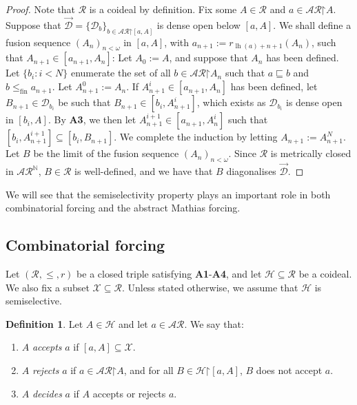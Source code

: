 \documentclass[10pt,a4paper]{amsart}
\theoremstyle{plain}
\numberwithin{equation}{section}
\theoremstyle{definition}
\newtheorem{definition}[theorem]{Definition}
\newcommand{\func}{\operatorname}
\newcommand{\N}{\mathbb{N}}
\newcommand{\cal}{\mathcal}
\newcommand{\restrictedto}{\mathord{\upharpoonright}}
\newcommand{\X}{\cal{X}}
\renewcommand{\H}{\cal{H}}
\newcommand{\lh}{\func{lh}}
\newcommand{\fin}{\mathrm{fin}}
\newcommand{\D}{\cal{D}}
\begin{document}
\begin{proof}
    Note that $\cal{R}$ is a coideal by definition. Fix some $A \in \cal{R}$ and $a \in \cal{AR}\restrictedto A$. Suppose that $\vec{\D} = \{\D_b\}_{b \in \cal{AR}\restrictedto[a,A]}$ is dense open below $[a,A]$. We shall define a fusion sequence $(A_n)_{n<\omega}$ in $[a,A]$, with $a_{n+1} := r_{\lh(a)+n+1}(A_n)$, such that $A_{n+1} \in [a_{n+1},A_n]$: Let $A_0 := A$, and suppose that $A_n$ has been defined. Let $\{b_i : i < N\}$ enumerate the set of all $b \in \cal{AR}\restrictedto A_n$ such that $a \sqsubseteq b$ and $b \leq_\fin a_{n+1}$. Let $A_{n+1}^0 := A_n$. If $A_{n+1}^i \in [a_{n+1},A_n]$ has been defined, let $B_{n+1} \in \D_{b_i}$ be such that $B_{n+1} \in [b_i,A_{n+1}^i]$, which exists as $\D_{b_i}$ is dense open in $[b_i,A]$. By \textbf{A3}, we then let $A_{n+1}^{i+1} \in [a_{n+1},A_n^i]$ such that $[b_i,A_{n+1}^{i+1}] \subseteq [b_i,B_{n+1}]$. We complete the induction by letting $A_{n+1} := A_{n+1}^N$. Let $B$ be the limit of the fusion sequence $(A_n)_{n<\omega}$. Since $\cal{R}$ is metrically closed in $\cal{AR}^\N$, $B \in \cal{R}$ is well-defined, and we have that $B$ diagonalises $\vec{\D}$. 
\end{proof}

We will see that the semiselectivity property plays an important role in both combinatorial forcing and the abstract Mathias forcing.

\subsection{Combinatorial forcing}
Let $(\cal{R},\leq,r)$ be a closed triple satisfying \textbf{A1}-\textbf{A4}, and let $\H \subseteq \cal{R}$ be a coideal. We also fix a subset $\X \subseteq \cal{R}$. Unless stated otherwise, we assume that $\H$ is semiselective.

\begin{definition}
    Let $A \in \H$ and let $a \in \cal{AR}$. We say that: 
    \begin{enumerate}
        \item $A$ \emph{accepts} $a$ if $[a,A] \subseteq \X$.
        
        \item $A$ \emph{rejects} $a$ if $a \in \cal{AR}\restrictedto A$, and for all $B \in \H\restrictedto[a,A]$, $B$ does not accept $a$.
        
        \item $A$ \emph{decides} $a$ if $A$ accepts or rejects $a$.
    \end{enumerate}
\end{definition}
\end{document}
